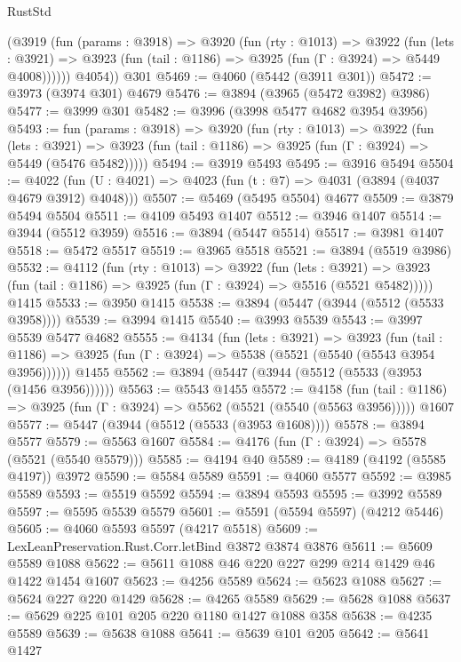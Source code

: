 \begin{lexlean}{RustStd}
\begin{coremodule}
{\begin{coremodule}
{{{{{{{{{{{{{{{{{{{{{{{{{{{{{{{{        (@3919
          (fun (params : @3918) =>
          @3920
            (fun (rty : @1013) =>
            @3922
              (fun (lets : @3921) =>
              @3923 (fun (tail : @1186) => @3925 (fun (Γ : @3924) => @5449 @4008))))))
        @4054))
    @301
@5469 := @4060 (@5442 (@3911 @301))
@5472 := @3973 (@3974 @301) @4679
@5476 := @3894 (@3965 (@5472 @3982) @3986)
@5477 := @3999 @301
@5482 := @3996 (@3998 @5477 @4682 @3954 @3956)
@5493 := fun (params : @3918) =>
  @3920
    (fun (rty : @1013) =>
    @3922
      (fun (lets : @3921) =>
      @3923 (fun (tail : @1186) => @3925 (fun (Γ : @3924) => @5449 (@5476 @5482)))))
@5494 := @3919 @5493
@5495 := @3916 @5494
@5504 := @4022 (fun (U : @4021) => @4023 (fun (t : @7) => @4031 (@3894 (@4037 @4679 @3912) @4048)))
@5507 := @5469 (@5495 @5504) @4677
@5509 := @3879 @5494 @5504
@5511 := @4109 @5493 @1407
@5512 := @3946 @1407
@5514 := @3944 (@5512 @3959)
@5516 := @3894 (@5447 @5514)
@5517 := @3981 @1407
@5518 := @5472 @5517
@5519 := @3965 @5518
@5521 := @3894 (@5519 @3986)
@5532 := @4112
    (fun (rty : @1013) =>
    @3922
      (fun (lets : @3921) =>
      @3923 (fun (tail : @1186) => @3925 (fun (Γ : @3924) => @5516 (@5521 @5482)))))
    @1415
@5533 := @3950 @1415
@5538 := @3894 (@5447 (@3944 (@5512 (@5533 @3958))))
@5539 := @3994 @1415
@5540 := @3993 @5539
@5543 := @3997 @5539 @5477 @4682
@5555 := @4134
    (fun (lets : @3921) =>
    @3923
      (fun (tail : @1186) => @3925 (fun (Γ : @3924) => @5538 (@5521 (@5540 (@5543 @3954 @3956))))))
    @1455
@5562 := @3894 (@5447 (@3944 (@5512 (@5533 (@3953 (@1456 @3956))))))
@5563 := @5543 @1455
@5572 := @4158
    (fun (tail : @1186) => @3925 (fun (Γ : @3924) => @5562 (@5521 (@5540 (@5563 @3956)))))
    @1607
@5577 := @5447 (@3944 (@5512 (@5533 (@3953 @1608))))
@5578 := @3894 @5577
@5579 := @5563 @1607
@5584 := @4176 (fun (Γ : @3924) => @5578 (@5521 (@5540 @5579)))
@5585 := @4194 @40
@5589 := @4189 (@4192 (@5585 @4197)) @3972
@5590 := @5584 @5589
@5591 := @4060 @5577
@5592 := @3985 @5589
@5593 := @5519 @5592
@5594 := @3894 @5593
@5595 := @3992 @5589
@5597 := @5595 @5539 @5579
@5601 := @5591 (@5594 @5597) (@4212 @5446)
@5605 := @4060 @5593 @5597 (@4217 @5518)
@5609 := LexLeanPreservation.Rust.Corr.letBind @3872 @3874 @3876
@5611 := @5609 @5589 @1088
@5622 := @5611 @1088 @46 @220 @227 @299 @214 @1429 @46 @1422 @1454 @1607
@5623 := @4256 @5589
@5624 := @5623 @1088
@5627 := @5624 @227 @220 @1429
@5628 := @4265 @5589
@5629 := @5628 @1088
@5637 := @5629 @225 @101 @205 @220 @1180 @1427 @1088 @358
@5638 := @4235 @5589
@5639 := @5638 @1088
@5641 := @5639 @101 @205
@5642 := @5641 @1427
}}}}}}}}}}}}}}}}}}}}}}}}}}}}}}}}
\end{coremodule}}
\end{coremodule}
\end{lexlean}
